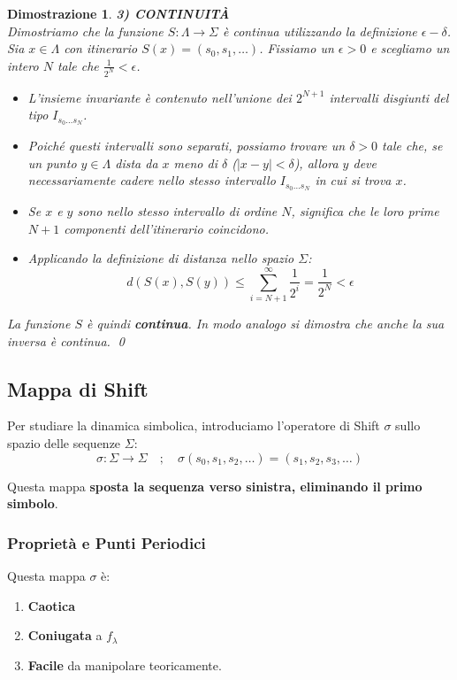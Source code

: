 \documentclass[openany]{book}
\newtheorem*{dimostrazione}{Dimostrazione}
\theoremstyle{definition}
\theoremstyle{remark}
\begin{document}
\begin{dimostrazione}
\vspace{1em}
\textbf{3) CONTINUITÀ} \\
Dimostriamo che la funzione $S: \Lambda \to \Sigma$ è continua utilizzando la definizione $\epsilon - \delta$.
Sia $x \in \Lambda$ con itinerario $S(x) = (s_0, s_1, \dots)$. 
Fissiamo un $\epsilon > 0$ e scegliamo un intero $N$ tale che $\frac{1}{2^N} < \epsilon$.
\begin{itemize}
    \item L'insieme invariante è contenuto nell'unione dei $2^{N+1}$ intervalli disgiunti del tipo $I_{s_0 \dots s_N}$.
    \item Poiché questi intervalli sono separati, possiamo trovare un $\delta > 0$ tale che, se un punto $y \in \Lambda$ dista da $x$ meno di $\delta$ ($|x - y| < \delta$), allora $y$ deve \textit{necessariamente} cadere nello stesso intervallo $I_{s_0 \dots s_N}$ in cui si trova $x$.
    \item Se $x$ e $y$ sono nello stesso intervallo di ordine $N$, significa che le loro prime $N+1$ componenti dell'itinerario coincidono.
    \item Applicando la definizione di distanza nello spazio $\Sigma$:
    $$ d(S(x), S(y)) \leq \sum_{i=N+1}^{\infty} \frac{1}{2^i} = \frac{1}{2^N} < \epsilon $$
\end{itemize}
La funzione $S$ è quindi \textbf{continua}. In modo analogo si dimostra che anche la sua inversa è continua. \qed
\end{dimostrazione}


\subsection{Mappa di Shift}

Per studiare la dinamica simbolica, introduciamo l'operatore di Shift $\sigma$ sullo spazio delle sequenze $\Sigma$:
$$ \sigma: \Sigma \to \Sigma \quad ; \quad \sigma(s_0, s_1, s_2, \dots) = (s_1, s_2, s_3, \dots) $$

Questa mappa \textbf{sposta la sequenza verso sinistra, eliminando il primo simbolo}.

\subsubsection*{Proprietà e Punti Periodici}
Questa mappa $\sigma$ è:
\begin{enumerate}
    \item \textbf{Caotica}
    \item \textbf{Coniugata} a $f_\lambda$  
    \item \textbf{Facile} da manipolare teoricamente.
\end{enumerate}
\end{document}
